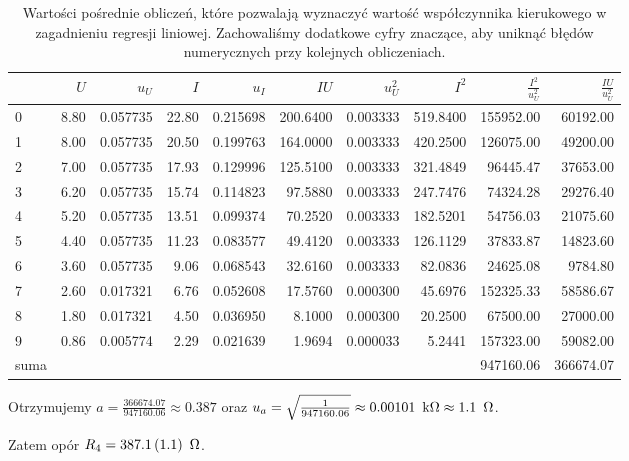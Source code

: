\documentclass[a4paper]{article}
\begin{document}
\begin{table}
\centering
\begin{tabular}{lrrrrrrrrr}
\toprule
{} &     $U$ &       $u_U$ &      $I$ &       $u_I$ &       $IU$ &     $u_U^2$ &       $I^2$ &    $\frac{I^2}{u_U^2}$ & $\frac{IU}{u_U^2}$ \\
\midrule
0 &  8.80 &  0.057735 &  22.80 &  0.215698 &  200.6400 &  0.003333 &  519.8400 &  155952.00 &  60192.00 \\
1 &  8.00 &  0.057735 &  20.50 &  0.199763 &  164.0000 &  0.003333 &  420.2500 &  126075.00 &  49200.00 \\
2 &  7.00 &  0.057735 &  17.93 &  0.129996 &  125.5100 &  0.003333 &  321.4849 &   96445.47 &  37653.00 \\
3 &  6.20 &  0.057735 &  15.74 &  0.114823 &   97.5880 &  0.003333 &  247.7476 &   74324.28 &  29276.40 \\
4 &  5.20 &  0.057735 &  13.51 &  0.099374 &   70.2520 &  0.003333 &  182.5201 &   54756.03 &  21075.60 \\
5 &  4.40 &  0.057735 &  11.23 &  0.083577 &   49.4120 &  0.003333 &  126.1129 &   37833.87 &  14823.60 \\
6 &  3.60 &  0.057735 &   9.06 &  0.068543 &   32.6160 &  0.003333 &   82.0836 &   24625.08 &   9784.80 \\
7 &  2.60 &  0.017321 &   6.76 &  0.052608 &   17.5760 &  0.000300 &   45.6976 &  152325.33 &  58586.67 \\
8 &  1.80 &  0.017321 &   4.50 &  0.036950 &    8.1000 &  0.000300 &   20.2500 &   67500.00 &  27000.00 \\
9 &  0.86 &  0.005774 &   2.29 &  0.021639 &    1.9694 &  0.000033 &    5.2441 &  157323.00 &  59082.00 \\
\midrule
	suma & {} & {} & {} & {} & {} & {} & {} & 947160.06 & 366674.07 \\
\bottomrule
\end{tabular}
\caption{Wartości pośrednie obliczeń, które pozwalają wyznaczyć wartość współczynnika kierukowego w zagadnieniu regresji liniowej. Zachowaliśmy dodatkowe cyfry znaczące, aby uniknąć błędów numerycznych przy kolejnych obliczeniach.}
\end{table}

Otrzymujemy $a = \frac{366674.07}{947160.06} \approx 0.387$ oraz $u_a = \sqrt{\frac{1}{947160.06}} \approx 0.00101 \enskip \text{k}\Omega \approx 1.1 \enskip \Omega$.

Zatem opór $R_4 = 387.1 \, (1.1) \enskip \Omega$.
\end{document}
